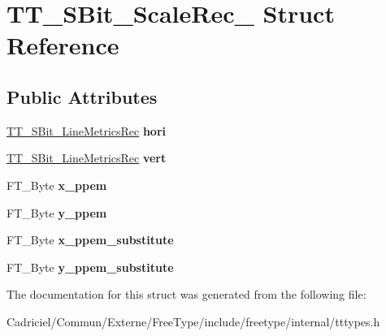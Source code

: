 \hypertarget{struct_t_t___s_bit___scale_rec__}{}\section{T\+T\+\_\+\+S\+Bit\+\_\+\+Scale\+Rec\+\_\+ Struct Reference}
\label{struct_t_t___s_bit___scale_rec__}
\subsection*{Public Attributes}
\begin{DoxyCompactItemize}
\item 
\hyperlink{struct_t_t___s_bit___line_metrics_rec__}{T\+T\+\_\+\+S\+Bit\+\_\+\+Line\+Metrics\+Rec} {\bfseries hori}\hypertarget{struct_t_t___s_bit___scale_rec___a2a61bc97ebb7ed996170a03612ffbbc0}{}\label{struct_t_t___s_bit___scale_rec___a2a61bc97ebb7ed996170a03612ffbbc0}

\item 
\hyperlink{struct_t_t___s_bit___line_metrics_rec__}{T\+T\+\_\+\+S\+Bit\+\_\+\+Line\+Metrics\+Rec} {\bfseries vert}\hypertarget{struct_t_t___s_bit___scale_rec___acbf5c459602d9f52ac04a914e2f12375}{}\label{struct_t_t___s_bit___scale_rec___acbf5c459602d9f52ac04a914e2f12375}

\item 
F\+T\+\_\+\+Byte {\bfseries x\+\_\+ppem}\hypertarget{struct_t_t___s_bit___scale_rec___a235731b0452ea063cccacd2f59b3f44c}{}\label{struct_t_t___s_bit___scale_rec___a235731b0452ea063cccacd2f59b3f44c}

\item 
F\+T\+\_\+\+Byte {\bfseries y\+\_\+ppem}\hypertarget{struct_t_t___s_bit___scale_rec___aa4c1fb419ea55c8c587ba81700c6ce66}{}\label{struct_t_t___s_bit___scale_rec___aa4c1fb419ea55c8c587ba81700c6ce66}

\item 
F\+T\+\_\+\+Byte {\bfseries x\+\_\+ppem\+\_\+substitute}\hypertarget{struct_t_t___s_bit___scale_rec___a71955e363b0b5da84ed2c15d0e6f832d}{}\label{struct_t_t___s_bit___scale_rec___a71955e363b0b5da84ed2c15d0e6f832d}

\item 
F\+T\+\_\+\+Byte {\bfseries y\+\_\+ppem\+\_\+substitute}\hypertarget{struct_t_t___s_bit___scale_rec___a3a9f554d0153f9e3022898c1f59a7b63}{}\label{struct_t_t___s_bit___scale_rec___a3a9f554d0153f9e3022898c1f59a7b63}

\end{DoxyCompactItemize}


The documentation for this struct was generated from the following file\+:\begin{DoxyCompactItemize}
\item 
Cadriciel/\+Commun/\+Externe/\+Free\+Type/include/freetype/internal/tttypes.\+h\end{DoxyCompactItemize}
